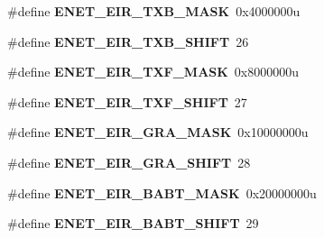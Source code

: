 \begin{DoxyCompactItemize}
\item 
\hypertarget{group___e_n_e_t___register___masks_ga8ba9c1624177eb39a170b3b365859ced}{}\#define {\bfseries E\+N\+E\+T\+\_\+\+E\+I\+R\+\_\+\+T\+X\+B\+\_\+\+M\+A\+S\+K}~0x4000000u\label{group___e_n_e_t___register___masks_ga8ba9c1624177eb39a170b3b365859ced}

\item 
\hypertarget{group___e_n_e_t___register___masks_gaa855bd984448a54af78d55584c066594}{}\#define {\bfseries E\+N\+E\+T\+\_\+\+E\+I\+R\+\_\+\+T\+X\+B\+\_\+\+S\+H\+I\+F\+T}~26\label{group___e_n_e_t___register___masks_gaa855bd984448a54af78d55584c066594}

\item 
\hypertarget{group___e_n_e_t___register___masks_ga06433ca8a67a5460754fe9b2074d8520}{}\#define {\bfseries E\+N\+E\+T\+\_\+\+E\+I\+R\+\_\+\+T\+X\+F\+\_\+\+M\+A\+S\+K}~0x8000000u\label{group___e_n_e_t___register___masks_ga06433ca8a67a5460754fe9b2074d8520}

\item 
\hypertarget{group___e_n_e_t___register___masks_gaefe127d672dddef700ffb0f0cac33df7}{}\#define {\bfseries E\+N\+E\+T\+\_\+\+E\+I\+R\+\_\+\+T\+X\+F\+\_\+\+S\+H\+I\+F\+T}~27\label{group___e_n_e_t___register___masks_gaefe127d672dddef700ffb0f0cac33df7}

\item 
\hypertarget{group___e_n_e_t___register___masks_ga172383b70c089716b68b3ffa7c6a5cd9}{}\#define {\bfseries E\+N\+E\+T\+\_\+\+E\+I\+R\+\_\+\+G\+R\+A\+\_\+\+M\+A\+S\+K}~0x10000000u\label{group___e_n_e_t___register___masks_ga172383b70c089716b68b3ffa7c6a5cd9}

\item 
\hypertarget{group___e_n_e_t___register___masks_gaaf2ca77536e8dbd47979124db1d4cb3c}{}\#define {\bfseries E\+N\+E\+T\+\_\+\+E\+I\+R\+\_\+\+G\+R\+A\+\_\+\+S\+H\+I\+F\+T}~28\label{group___e_n_e_t___register___masks_gaaf2ca77536e8dbd47979124db1d4cb3c}

\item 
\hypertarget{group___e_n_e_t___register___masks_ga2ee6dd7628d551b9a94c482a567d21fa}{}\#define {\bfseries E\+N\+E\+T\+\_\+\+E\+I\+R\+\_\+\+B\+A\+B\+T\+\_\+\+M\+A\+S\+K}~0x20000000u\label{group___e_n_e_t___register___masks_ga2ee6dd7628d551b9a94c482a567d21fa}

\item 
\hypertarget{group___e_n_e_t___register___masks_ga316dbe501e294bfeedecda20bb81cdc6}{}\#define {\bfseries E\+N\+E\+T\+\_\+\+E\+I\+R\+\_\+\+B\+A\+B\+T\+\_\+\+S\+H\+I\+F\+T}~29\label{group___e_n_e_t___register___masks_ga316dbe501e294bfeedecda20bb81cdc6}


\end{DoxyCompactItemize}

